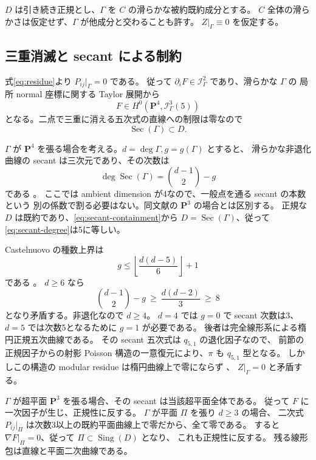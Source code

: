 \documentclass[11pt,a4paper]{ltjsarticle}
\newcommand{\PP}{\mathbf P}\renewcommand{\AA}{\mathbf A}
\theoremstyle{remark}\newtheorem{remark}[theorem]{注意}
\begin{document}
$D$ は引き続き正規とし、$\Gamma$ を $C$ の滑らかな被約既約成分とする。
$C$ 全体の滑らかさは仮定せず、$\Gamma$ が他成分と交わることも許す。
$Z|_\Gamma\equiv0$ を仮定する。

\subsection{三重消滅と secant による制約}

式\eqref{eq:residue}より $P_{ij}|_\Gamma=0$ である。
従って $\partial_iF\in\mathcal I_\Gamma^2$ であり、滑らかな $\Gamma$ の
局所 normal 座標に関する Taylor 展開から
\begin{equation}\label{eq:triple-vanishing}
                  F\in H^0(\PP^4,\mathcal I_\Gamma^3(5))
\end{equation}
となる。二点で三重に消える五次式の直線への制限は零なので
\begin{equation}\label{eq:secant-containment}
                          \operatorname{Sec}(\Gamma)\subset D.
\end{equation}

$\Gamma$ が $\PP^4$ を張る場合を考える。$d=\deg\Gamma,g=g(\Gamma)$ とすると、
滑らかな非退化曲線の secant は三次元であり、その次数は
\begin{equation}\label{eq:secant-degree}
                 \deg\operatorname{Sec}(\Gamma)=\binom{d-1}{2}-g
\end{equation}
である \cite[Theorem 3.5]{AMSSecant}。
ここでは ambient dimension が4なので、一般点を通る secant の本数という
別の係数で割る必要はない。同文献の $\PP^3$ の場合とは区別する。
正規な $D$ は既約であり、\eqref{eq:secant-containment}から
$D=\operatorname{Sec}(\Gamma)$、従って \eqref{eq:secant-degree}は5に等しい。

Castelnuovo の種数上界は
\[
                g\le\left\lfloor\frac{d(d-5)}6\right\rfloor+1
\]
である \cite[Proposition 2.6, Corollary 2.7]{BlancLamy}。
$d\ge6$ なら
\[
 \binom{d-1}{2}-g\ \ge\ \frac{d(d-2)}3\ \ge\ 8
\]
となり矛盾する。非退化なので $d\ge4$。
$d=4$ では $g=0$ で secant 次数は3、$d=5$ では次数5となるために $g=1$ が必要である。
後者は完全線形系による楕円正規五次曲線である。
その secant 五次式は $q_{5,1}$ の退化因子なので、
前節の正規因子からの射影 Poisson 構造の一意復元により、$\pi$ も $q_{5,1}$ 型となる。
しかしこの構造の modular residue は楕円曲線上で零にならず
\cite[Proposition 8.5]{GP}、
$Z|_\Gamma=0$ と矛盾する。

$\Gamma$ が超平面 $\PP^3$ を張る場合、その secant は当該超平面全体である。
従って $F$ に一次因子が生じ、正規性に反する。
$\Gamma$ が平面 $\Pi$ を張り $d\ge3$ の場合、
二次式 $P_{ij}|_\Pi$ は次数3以上の既約平面曲線上で零だから、全て零である。
すると $\nabla F|_\Pi=0$、従って $\Pi\subset\operatorname{Sing}(D)$ となり、
これも正規性に反する。
残る線形包は直線と平面二次曲線である。
\end{document}
